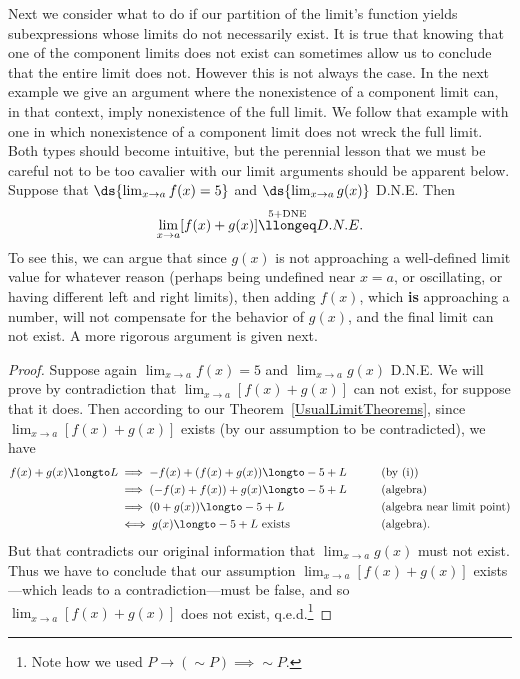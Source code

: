\eex


Next we consider what to do if our partition of the limit's
function yields subexpressions whose limits do not necessarily exist.
It is true that knowing that one of the component limits does not exist 
can sometimes allow us to conclude that the entire limit
does not.  However this is not always the case.  In the
next example we give an argument where the nonexistence of
a component limit can, in that context, imply nonexistence
of the full limit.  We follow that example with
one in which nonexistence of a component limit does not wreck the
full limit.  Both types should become intuitive, but the perennial lesson
that we must be careful not to be too cavalier with our limit 
arguments should be apparent below.
\bex Suppose that $\ds{\lim_{x\to a}f(x)=5}$ and 
$\ds{\lim_{x\to a}g(x)}$ D.N.E.
Then 
$$\lim_{x\to a}[f(x)+g(x)]\overset{5+\text{DNE}}{\llongeq} D.N.E.$$
To see this, we can argue that since $g(x)$ is not approaching a 
well-defined limit value
for whatever reason (perhaps being 
undefined near $x=a$, or oscillating,
or having different left and right limits), then
adding $f(x)$, which {\bf is} approaching a number, will not
compensate for the behavior of $g(x)$, and the final limit can not
exist.
A more rigorous argument is given next.

\begin{proof}
Suppose again $\lim_{x\to a}f(x)=5$ and $\lim_{x\to a}g(x) $ D.N.E.
We will  prove by contradiction that
$\lim_{x\to a}[f(x)+g(x)]$ can not exist, for suppose that it does.
Then according to our Theorem~\ref{UsualLimitTheorems},
since $\lim_{x\to a}[f(x)+g(x)]$ exists (by our assumption to
be contradicted), we have
\begin{alignat*}{3}
f(x)+g(x)\longto L&\implies -f(x)+(f(x)+g(x))\longto-5+L\qquad&&
                  \text{(by (i))}\\
  &\implies (-f(x)+f(x))+g(x)\longto -5+L&&\text{(algebra)}\\
  &\implies (0+g(x))\longto-5+L &&\text{(algebra near limit point)}\\
  &\iff g(x)\longto -5+L\text{ exists}&&\text{(algebra).}
\end{alignat*}
But that contradicts our original information that $\lim_{x\to a}g(x)$
must not exist.  Thus we have to conclude that our assumption
$\lim_{x\to a}[f(x)+g(x)]$ exists---which leads to a 
contradiction---must be false, and so $\lim_{x\to a}[f(x)+g(x)]$  does not 
exist, q.e.d.\footnote{%
Note how we used $P\longrightarrow(\sim P)\implies\sim P$. 
}\end{proof}
\eex

